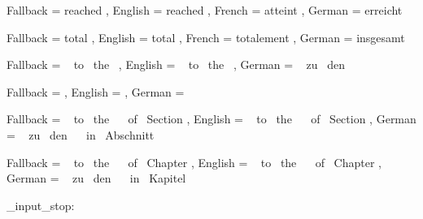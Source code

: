  {
  Fallback = reached ,
  English  = reached ,
  French   = atteint ,
  German   = erreicht
}

 {
  Fallback = total ,
  English  = total ,
  French   = totalement ,
  German   = insgesamt
}

 {
  Fallback = ~
             to~ the~  ,
  English  = ~
             to~ the~  ,
  German   = ~
             zu~ den~ 
}

 {
  Fallback =  ,
  English  =  ,
  German   = 
}

 {
  Fallback = ~
             to~ the~ ~
             of~ Section \nobreakspace \ExerciseSection ,
  English  = ~
             to~ the~ ~
             of~ Section \nobreakspace \ExerciseSection ,
  German   = ~
             zu~ den~ ~
             in~ Abschnitt \nobreakspace \ExerciseSection
}

 {
  Fallback = ~
             to~ the~ ~
             of~ Chapter \nobreakspace \ExerciseChapter ,
  English  = ~
             to~ the~ ~
             of~ Chapter \nobreakspace \ExerciseChapter ,
  German   = ~
             zu~ den~ ~
             in~ Kapitel \nobreakspace \ExerciseChapter
}

\file_input_stop:
